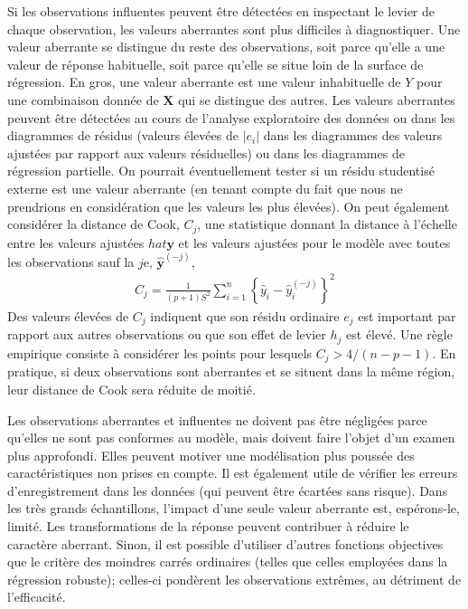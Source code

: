\documentclass[
  11pt,
  letterpaper,
]{scrbook}
\theoremstyle{definition}
\theoremstyle{definition}
\theoremstyle{plain}
\theoremstyle{plain}
\theoremstyle{remark}
\begin{document}
Si les observations influentes peuvent être détectées en inspectant le
levier de chaque observation, les valeurs aberrantes sont plus
difficiles à diagnostiquer. Une valeur aberrante se distingue du reste
des observations, soit parce qu'elle a une valeur de réponse habituelle,
soit parce qu'elle se situe loin de la surface de régression. En gros,
une valeur aberrante est une valeur inhabituelle de \(Y\) pour une
combinaison donnée de \(\mathbf{X}\) qui se distingue des autres. Les
valeurs aberrantes peuvent être détectées au cours de l'analyse
exploratoire des données ou dans les diagrammes de résidus (valeurs
élevées de \(|e_i|\) dans les diagrammes des valeurs ajustées par
rapport aux valeurs résiduelles) ou dans les diagrammes de régression
partielle. On pourrait éventuellement tester si un résidu studentisé
externe est une valeur aberrante (en tenant compte du fait que nous ne
prendrions en considération que les valeurs les plus élevées). On peut
également considérer la distance de Cook, \(C_j\), une statistique
donnant la distance à l'échelle entre les valeurs ajustées
\(hat{\boldsymbol{y}}\) et les valeurs ajustées pour le modèle avec
toutes les observations sauf la \(j\)e, \(\hat{\boldsymbol{y}}^{(-j)}\),
\begin{align*}
C_j = \frac{1}{(p+1)S^2} \sum_{i=1}^n \left\{\hat{y}_i - \hat{y}_{i}^{(-j)}\right\}^2
\end{align*} Des valeurs élevées de \(C_j\) indiquent que son résidu
ordinaire \(e_j\) est important par rapport aux autres observations ou
que son effet de levier \(h_j\) est élevé. Une règle empirique consiste
à considérer les points pour lesquels \(C_j > 4/(n-p-1)\). En pratique,
si deux observations sont aberrantes et se situent dans la même région,
leur distance de Cook sera réduite de moitié.

Les observations aberrantes et influentes ne doivent pas être négligées
parce qu'elles ne sont pas conformes au modèle, mais doivent faire
l'objet d'un examen plus approfondi. Elles peuvent motiver une
modélisation plus poussée des caractéristiques non prises en compte. Il
est également utile de vérifier les erreurs d'enregistrement dans les
données (qui peuvent être écartées sans risque). Dans les très grands
échantillons, l'impact d'une seule valeur aberrante est, espérons-le,
limité. Les transformations de la réponse peuvent contribuer à réduire
le caractère aberrant. Sinon, il est possible d'utiliser d'autres
fonctions objectives que le critère des moindres carrés ordinaires
(telles que celles employées dans la régression robuste); celles-ci
pondèrent les observations extrêmes, au détriment de l'efficacité.
\end{document}
